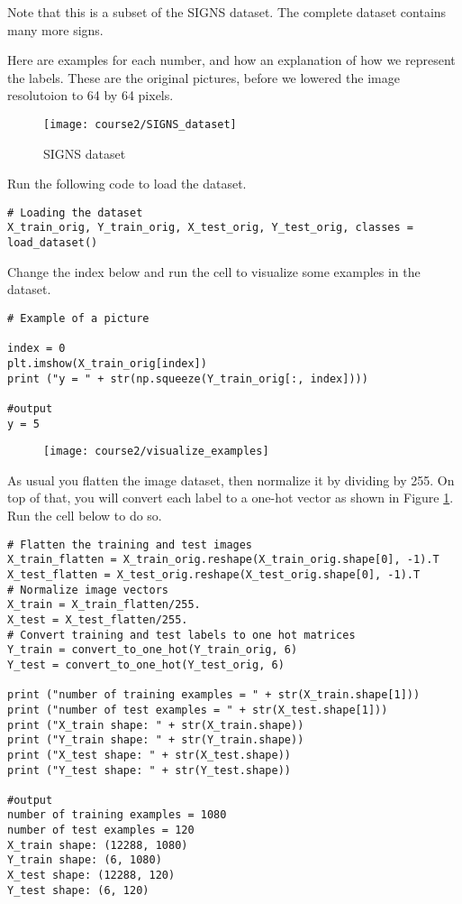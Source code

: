 Note that this is a subset of the SIGNS dataset. The complete dataset contains many more signs.

Here are examples for each number, and how an explanation of how we represent the labels. These are the original pictures, before we lowered the image resolutoion to 64 by 64 pixels.

\begin{figure}[h]
\begin{center}
\texttt{[image: course2/SIGNS\_dataset]}
\caption{SIGNS dataset}
\label{SIGNS_dataset}
\end{center}
\end{figure}
 
Run the following code to load the dataset.
\begin{verbatim} 
# Loading the dataset
X_train_orig, Y_train_orig, X_test_orig, Y_test_orig, classes = load_dataset()
\end{verbatim} 


Change the index below and run the cell to visualize some examples in the dataset.

\begin{verbatim} 
# Example of a picture

index = 0
plt.imshow(X_train_orig[index])
print ("y = " + str(np.squeeze(Y_train_orig[:, index])))

#output
y = 5
\end{verbatim} 

\begin{figure}[h]
\begin{center}
\texttt{[image: course2/visualize\_examples]}
\end{center}
\end{figure}
 
As usual you flatten the image dataset, then normalize it by dividing by 255. On top of that, you will convert each label to a one-hot vector as shown in Figure \ref{SIGNS_dataset}. Run the cell below to do so.


\begin{verbatim} 
# Flatten the training and test images
X_train_flatten = X_train_orig.reshape(X_train_orig.shape[0], -1).T
X_test_flatten = X_test_orig.reshape(X_test_orig.shape[0], -1).T
# Normalize image vectors
X_train = X_train_flatten/255.
X_test = X_test_flatten/255.
# Convert training and test labels to one hot matrices
Y_train = convert_to_one_hot(Y_train_orig, 6)
Y_test = convert_to_one_hot(Y_test_orig, 6)

print ("number of training examples = " + str(X_train.shape[1]))
print ("number of test examples = " + str(X_test.shape[1]))
print ("X_train shape: " + str(X_train.shape))
print ("Y_train shape: " + str(Y_train.shape))
print ("X_test shape: " + str(X_test.shape))
print ("Y_test shape: " + str(Y_test.shape))

#output
number of training examples = 1080
number of test examples = 120
X_train shape: (12288, 1080)
Y_train shape: (6, 1080)
X_test shape: (12288, 120)
Y_test shape: (6, 120)
\end{verbatim} 


